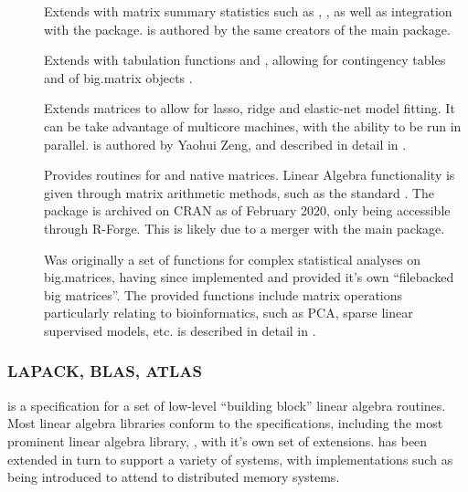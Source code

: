 \begin{description}
    \item[]
        Extends  with matrix summary statistics such as
        , , as well as integration with the 
        package\cite{emerson16}.  is authored by the same creators
        of the main  package.
    \item[]
        Extends  with tabulation functions and ,
        allowing for contingency tables and  of big.matrix
        objects \cite{kane16}.
    \item[]
        Extends  matrices to allow for lasso, ridge and elastic-net
        model fitting. It can be take advantage of multicore machines, with the
        ability to be run in parallel.  is authored by Yaohui Zeng, and
        described in detail in \textcite{zeng2017biglasso}.
    \item[]
        Provides  routines for  and native \R matrices. Linear
        Algebra functionality is given through matrix arithmetic methods, such
        as the standard . The package is archived
        on CRAN as of February 2020, only being accessible through R-Forge. This
        is likely due to a merger with the main  package.
    \item[]
        Was originally a set of functions for complex statistical analyses on
        big.matrices, having since implemented and provided it's own
        ``filebacked big matrices''\cite{prive2018efficient}. The provided
        functions include matrix operations particularly relating to
        bioinformatics, such as PCA, sparse linear supervised models, etc.
         is described in detail in \textcite{prive2018efficient}.
\end{description}

\subsubsection{LAPACK, BLAS, ATLAS}\label{subsec:blas-lapack}

 is a specification for a set of low-level ``building block'' linear
algebra routines\cite{lawson1979basic}. Most linear algebra libraries
conform to the  specifications, including the most prominent linear
algebra library, , with it's own set of
extensions\cite{demmel1989lapack}.  has been extended in turn to
support a variety of systems, with implementations such as 
being introduced to attend to distributed memory
systems\cite{choi1992scalapack}.

